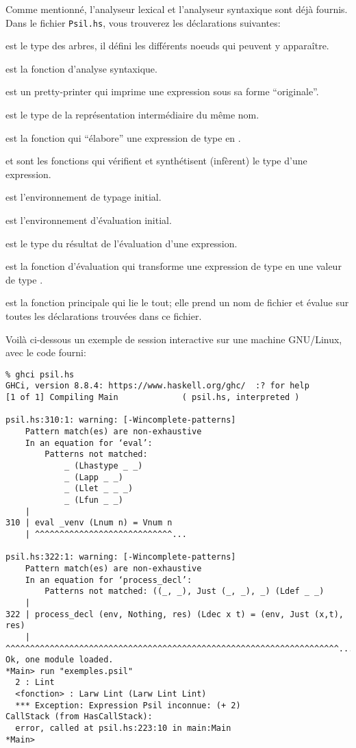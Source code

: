 \documentclass{article}
\begin{document}
Comme mentionné, l'analyseur lexical et l'analyseur syntaxique sont
déjà fournis.  Dans le fichier \texttt{Psil.hs}, vous trouverez les
déclarations suivantes:
\begin{outitemize}
\item {} est le type des arbres, il défini les différents noeuds qui
  peuvent y apparaître.
\item {} est la fonction d'analyse syntaxique.
\item {} est un pretty-printer qui imprime une expression sous sa
  forme ``originale''.
\item {} est le type de la représentation intermédiaire du même nom.
\item {} est la fonction qui ``élabore'' une expression de type
   en .
\item {} et  sont les fonctions qui vérifient et
  synthétisent (infèrent) le type d'une expression.
\item {} est l'environnement de typage initial.
\item {} est l'environnement d'évaluation initial.
\item {} est le type du résultat de l'évaluation d'une expression.
\item {} est la fonction d'évaluation qui transforme une expression
  de type  en une valeur de type .
\item {} est la fonction principale qui lie le tout; elle prend un nom
  de fichier et évalue sur toutes les déclarations trouvées dans ce fichier.
\end{outitemize}

Voilà ci-dessous un exemple de session interactive sur une machine GNU/Linux,
avec le code fourni:
\begin{verbatim}
% ghci psil.hs
GHCi, version 8.8.4: https://www.haskell.org/ghc/  :? for help
[1 of 1] Compiling Main             ( psil.hs, interpreted )

psil.hs:310:1: warning: [-Wincomplete-patterns]
    Pattern match(es) are non-exhaustive
    In an equation for ‘eval’:
        Patterns not matched:
            _ (Lhastype _ _)
            _ (Lapp _ _)
            _ (Llet _ _ _)
            _ (Lfun _ _)
    |
310 | eval _venv (Lnum n) = Vnum n
    | ^^^^^^^^^^^^^^^^^^^^^^^^^^^^...

psil.hs:322:1: warning: [-Wincomplete-patterns]
    Pattern match(es) are non-exhaustive
    In an equation for ‘process_decl’:
        Patterns not matched: ((_, _), Just (_, _), _) (Ldef _ _)
    |
322 | process_decl (env, Nothing, res) (Ldec x t) = (env, Just (x,t), res)
    | ^^^^^^^^^^^^^^^^^^^^^^^^^^^^^^^^^^^^^^^^^^^^^^^^^^^^^^^^^^^^^^^^^^^^...
Ok, one module loaded.
*Main> run "exemples.psil"
  2 : Lint
  <fonction> : Larw Lint (Larw Lint Lint)
  *** Exception: Expression Psil inconnue: (+ 2)
CallStack (from HasCallStack):
  error, called at psil.hs:223:10 in main:Main
*Main> 
\end{verbatim}
\end{document}
